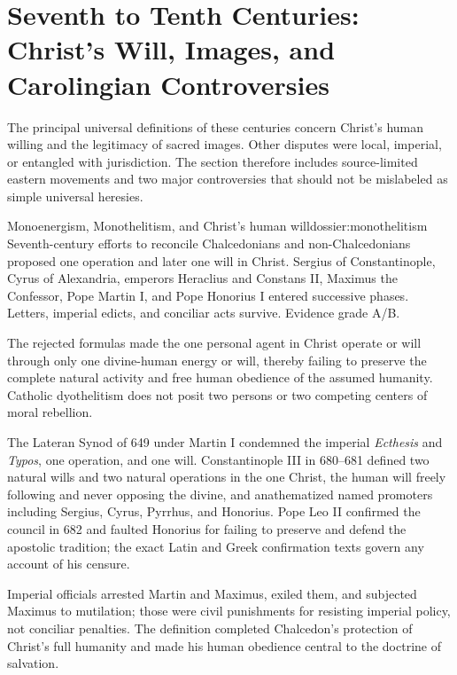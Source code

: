 \section{Seventh to Tenth Centuries: Christ's Will, Images, and Carolingian Controversies}

The principal universal definitions of these centuries concern Christ's human willing and the legitimacy of sacred images. Other disputes were local, imperial, or entangled with jurisdiction. The section therefore includes source-limited eastern movements and two major controversies that should not be mislabeled as simple universal heresies.

\begin{heresydossier}{Monoenergism, Monothelitism, and Christ's human will}{dossier:monothelitism}
\objectfield Seventh-century efforts to reconcile Chalcedonians and non-Chalcedonians proposed one operation and later one will in Christ. Sergius of Constantinople, Cyrus of Alexandria, emperors Heraclius and Constans II, Maximus the Confessor, Pope Martin I, and Pope Honorius I entered successive phases. Letters, imperial edicts, and conciliar acts survive. Evidence grade A/B.

\propositionfield The rejected formulas made the one personal agent in Christ operate or will through only one divine-human energy or will, thereby failing to preserve the complete natural activity and free human obedience of the assumed humanity. Catholic dyothelitism does not posit two persons or two competing centers of moral rebellion.

\responsefield The Lateran Synod of 649 under Martin I condemned the imperial \emph{Ecthesis} and \emph{Typos}, one operation, and one will. Constantinople III in 680--681 defined two natural wills and two natural operations in the one Christ, the human will freely following and never opposing the divine, and anathematized named promoters including Sergius, Cyrus, Pyrrhus, and Honorius. Pope Leo II confirmed the council in 682 and faulted Honorius for failing to preserve and defend the apostolic tradition; the exact Latin and Greek confirmation texts govern any account of his censure.

\aftermathfield Imperial officials arrested Martin and Maximus, exiled them, and subjected Maximus to mutilation; those were civil punishments for resisting imperial policy, not conciliar penalties. The definition completed Chalcedon's protection of Christ's full humanity and made his human obedience central to the doctrine of salvation.
\end{heresydossier}

